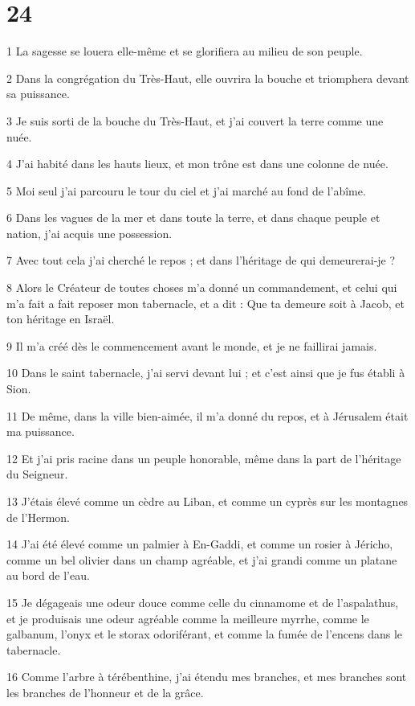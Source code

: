 \chapter{24}

\par 1 La sagesse se louera elle-même et se glorifiera au milieu de son peuple.
\par 2 Dans la congrégation du Très-Haut, elle ouvrira la bouche et triomphera devant sa puissance.
\par 3 Je suis sorti de la bouche du Très-Haut, et j'ai couvert la terre comme une nuée.
\par 4 J'ai habité dans les hauts lieux, et mon trône est dans une colonne de nuée.
\par 5 Moi seul j'ai parcouru le tour du ciel et j'ai marché au fond de l'abîme.
\par 6 Dans les vagues de la mer et dans toute la terre, et dans chaque peuple et nation, j'ai acquis une possession.
\par 7 Avec tout cela j'ai cherché le repos ; et dans l'héritage de qui demeurerai-je ?
\par 8 Alors le Créateur de toutes choses m'a donné un commandement, et celui qui m'a fait a fait reposer mon tabernacle, et a dit : Que ta demeure soit à Jacob, et ton héritage en Israël.
\par 9 Il m'a créé dès le commencement avant le monde, et je ne faillirai jamais.
\par 10 Dans le saint tabernacle, j'ai servi devant lui ; et c'est ainsi que je fus établi à Sion.
\par 11 De même, dans la ville bien-aimée, il m'a donné du repos, et à Jérusalem était ma puissance.
\par 12 Et j'ai pris racine dans un peuple honorable, même dans la part de l'héritage du Seigneur.
\par 13 J'étais élevé comme un cèdre au Liban, et comme un cyprès sur les montagnes de l'Hermon.
\par 14 J'ai été élevé comme un palmier à En-Gaddi, et comme un rosier à Jéricho, comme un bel olivier dans un champ agréable, et j'ai grandi comme un platane au bord de l'eau.
\par 15 Je dégageais une odeur douce comme celle du cinnamome et de l'aspalathus, et je produisais une odeur agréable comme la meilleure myrrhe, comme le galbanum, l'onyx et le storax odoriférant, et comme la fumée de l'encens dans le tabernacle.
\par 16 Comme l'arbre à térébenthine, j'ai étendu mes branches, et mes branches sont les branches de l'honneur et de la grâce.
